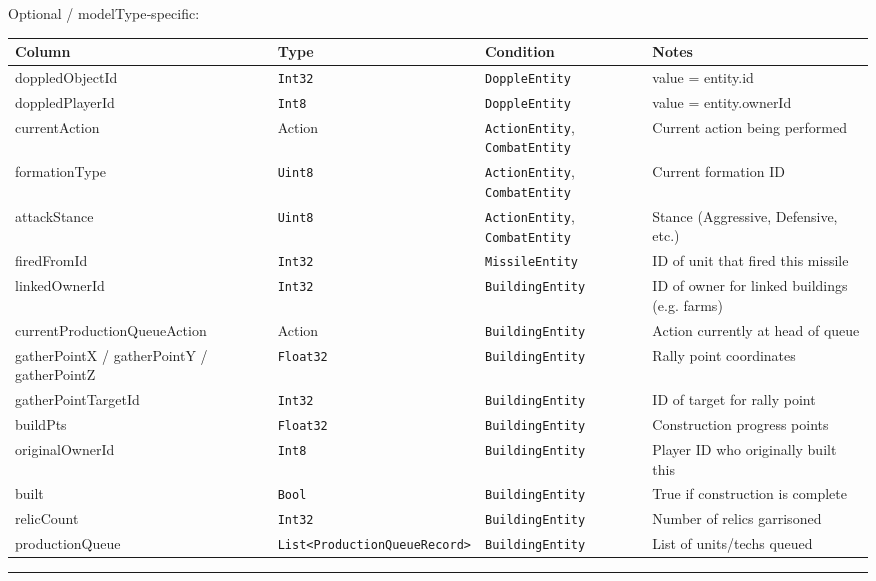Optional / modelType‑specific:

\begin{longtable}{@{}p{}p{}p{}p{}@{}}
  \toprule
  Column & Type & Condition & Notes \\
  \midrule
  \endhead
  doppledObjectId & \texttt{Int32} & \texttt{DoppleEntity} & value = entity.id \\
  doppledPlayerId & \texttt{Int8} & \texttt{DoppleEntity} & value = entity.ownerId \\
  currentAction & Action & \texttt{ActionEntity}, \texttt{CombatEntity} & Current action being performed \\
  formationType & \texttt{Uint8} & \texttt{ActionEntity}, \texttt{CombatEntity} & Current formation ID \\
  attackStance & \texttt{Uint8} & \texttt{ActionEntity}, \texttt{CombatEntity} & Stance (Aggressive, Defensive, etc.) \\
  firedFromId & \texttt{Int32} & \texttt{MissileEntity} & ID of unit that fired this missile \\
  linkedOwnerId & \texttt{Int32} & \texttt{BuildingEntity} & ID of owner for linked buildings (e.g. farms) \\
  current\-Production\-Queue\-Action & Action & \texttt{BuildingEntity} & Action currently at head of queue \\
  gatherPointX / gatherPointY / gatherPointZ & \texttt{Float32} & \texttt{BuildingEntity} & Rally point coordinates \\
  gatherPointTargetId & \texttt{Int32} & \texttt{BuildingEntity} & ID of target for rally point \\
  buildPts & \texttt{Float32} & \texttt{BuildingEntity} & Construction progress points \\
  originalOwnerId & \texttt{Int8} & \texttt{BuildingEntity} & Player ID who originally built this \\
  built & \texttt{Bool} & \texttt{BuildingEntity} & True if construction is complete \\
  relicCount & \texttt{Int32} & \texttt{BuildingEntity} & Number of relics garrisoned \\
  productionQueue & \texttt{List\-<Production}\-\texttt{Queue}\-\texttt{Record>} & \texttt{BuildingEntity} & List of units/techs queued \\
  \bottomrule
\end{longtable}

\par\noindent\rule{\textwidth}{0.4pt}

